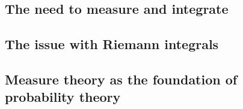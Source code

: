 
\subsection{The need to measure and integrate}



\subsection{The issue with Riemann integrals}


\subsection{Measure theory as the foundation of probability theory}




